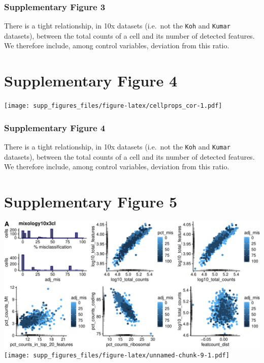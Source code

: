 \documentclass[]{article}
\begin{document}
\hypertarget{supplementary-figure-3-1}{%
\subsubsection{Supplementary Figure 3}\label{supplementary-figure-3-1}}

There is a tight relationship, in 10x datasets (i.e.~not the
\texttt{Koh} and \texttt{Kumar} datasets), between the total counts of a
cell and its number of detected features. We therefore include, among
control variables, deviation from this ratio.

\newpage

\hypertarget{supplementary-figure-4}{%
\section{Supplementary Figure 4}\label{supplementary-figure-4}}

\texttt{[image: supp\_figures\_files/figure-latex/cellprops\_cor-1.pdf]}

\hypertarget{supplementary-figure-4-1}{%
\subsubsection{Supplementary Figure 4}\label{supplementary-figure-4-1}}

There is a tight relationship, in 10x datasets (i.e.~not the
\texttt{Koh} and \texttt{Kumar} datasets), between the total counts of a
cell and its number of detected features. We therefore include, among
control variables, deviation from this ratio.

\newpage

\hypertarget{supplementary-figure-5}{%
\section{Supplementary Figure 5}\label{supplementary-figure-5}}

\includegraphics{supp_figures_files/figure-latex/misclass-1.pdf} \vfill
\texttt{[image: supp\_figures\_files/figure-latex/unnamed-chunk-9-1.pdf]}
\end{document}

